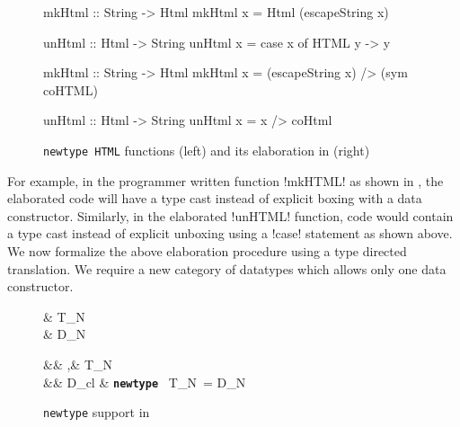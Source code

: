 \documentclass[screen,nonacm,manuscript,review]{acmart} %
\begin{document}
\begin{figure}[ht]
  \centering
  \begin{minipage}[ht]{0.5\linewidth}
    \begin{code}
      mkHtml :: String -> Html
      mkHtml x = Html (escapeString x)

      unHtml :: Html -> String
      unHtml x = case x of HTML y -> y
    \end{code}
  \end{minipage}%
  \begin{minipage}[ht]{0.5\linewidth}
    \begin{code}
      mkHtml :: String -> Html
      mkHtml x = (escapeString x) /> (sym coHTML)

      unHtml :: Html -> String
      unHtml x = x /> coHtml
    \end{code}
  \end{minipage}
  \caption[\lstinline{HTML}]{\lstinline{newtype HTML} functions (left) and its elaboration in \SFC (right)}
  \label{fig:newtype-html-example}
\end{figure}

For example, in the programmer written function !mkHTML! as shown in , the elaborated \SFC code will have a type cast instead of explicit boxing with a data constructor. Similarly, in the elaborated !unHTML! function, code would contain a type cast instead of explicit unboxing using a !case! statement as shown above. We now formalize the above elaboration procedure using a type directed translation. We require a new category of datatypes which allows only one data constructor.

\begin{figure}[ht]
  \centering
  \begin{syntax}
     & T_N\\
     & D_N
  \end{syntax}
  \begin{syntax}
                   && \tau,\sigma \bnfeq& \alpha \bnfor \cdots \bnfor T_N\\
     && D_{cl} \bnfeq& \texttt{\textbf{newtype}}~ T_{N}~\many\alpha = D_N~\\
  \end{syntax}
  \caption{\lstinline{newtype} support in \SFC}
  \label{fig:newtypes-sfc}
\end{figure}
\end{document}
